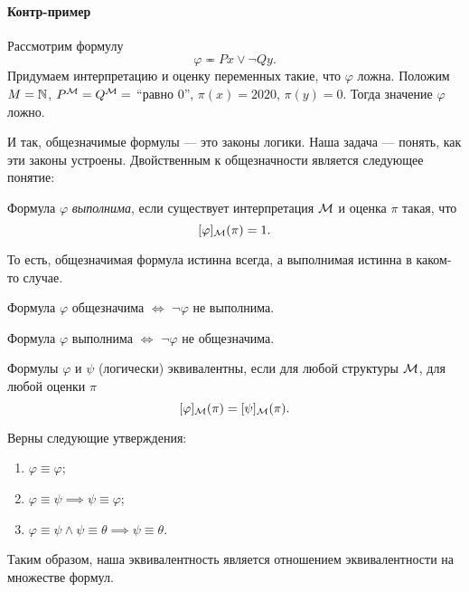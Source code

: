 \paragraph{Контр-пример}
Рассмотрим формулу
$$
    \varphi \eqcirc Px \lor \neg Qy.
$$
Придумаем интерпретацию и оценку переменных такие, что $\varphi$ ложна.
Положим $M = \mathbb{N}$, $P^{\mathcal{M}} = Q^{\mathcal{M}} =$ \enquote{равно 0}, $\pi(x) = 2020$, $\pi(y) = 0$.
Тогда значение $\varphi$ ложно.

И так, общезначимые формулы --- это законы логики.
Наша задача --- понять, как эти законы устроены.
Двойственным к общезначности является следующее понятие:

\begin{definition}
    Формула $\varphi$ {\it выполнима}, если существует интерпретация $\mathcal{M}$ и оценка $\pi$ такая, что
    $$
        [\varphi]_{\mathcal{M}}(\pi) = 1.
    $$
\end{definition}

То есть, общезначимая формула истинна всегда, а выполнимая истинна в каком-то случае.

\begin{lemma}
    Формула $\varphi$ общезначима $\iff$ $\neg \varphi$ не выполнима.
\end{lemma}

\begin{lemma}
    Формула $\varphi$ выполнима $\iff$ $\neg \varphi$ не общезначима.
\end{lemma}

\begin{definition}
    Формулы $\varphi$ и $\psi$ (логически) эквивалентны, если для любой структуры $\mathcal{M}$, для любой оценки $\pi$
    $$
        [\varphi]_{\mathcal{M}}(\pi) = [\psi]_{\mathcal{M}}(\pi).
    $$
\end{definition}

\begin{lemma}
    Верны следующие утверждения:
    \begin{enumerate}
        \item $\varphi \equiv \varphi$;
        \item $\varphi \equiv \psi \implies \psi \equiv \varphi$;
        \item $\varphi \equiv \psi \land \psi \equiv \theta \implies \psi \equiv \theta$.
    \end{enumerate}
\end{lemma}

Таким образом, наша эквивалентность является отношением эквивалентности на множестве формул.


